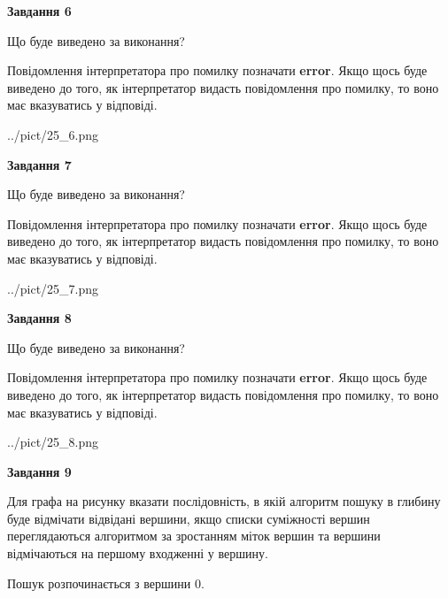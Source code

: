\documentclass[12pt, ukrainian]{article}
\begin{document}
{\begin {large}
{\begin {center}\textbf{Завдання 6}\end {center}}\par
Що буде виведено за виконання?

Повідомлення інтерпретатора про помилку позначати \textbf{error}.
Якщо щось буде виведено до того, як інтерпретатор видасть повідомлення про помилку, 
то воно має вказуватись у відповіді. \par


\begin{center}
	{../pict/25_6.png}
\end{center}
\newpage

{\begin {center}\textbf{Завдання 7}\end {center}}\par
Що буде виведено за виконання?

Повідомлення інтерпретатора про помилку позначати \textbf{error}.
Якщо щось буде виведено до того, як інтерпретатор видасть повідомлення про помилку, 
то воно має вказуватись у відповіді. \par


\begin{center}
	{../pict/25_7.png}
\end{center}
\newpage

{\begin {center}\textbf{Завдання 8}\end {center}}\par
Що буде виведено за виконання?

Повідомлення інтерпретатора про помилку позначати \textbf{error}.
Якщо щось буде виведено до того, як інтерпретатор видасть повідомлення про помилку, 
то воно має вказуватись у відповіді. \par


\begin{center}
	{../pict/25_8.png}
\end{center}
\newpage

{\begin {center}\textbf{Завдання 9}\end {center}}\par
Для графа на рисунку вказати послідовність, в якій алгоритм пошуку в глибину буде відмічати відвідані вершини, якщо списки суміжності вершин переглядаються алгоритмом за зростанням міток вершин та вершини відмічаються на першому вход\-женні у вершину.\par
Пошук розпочинається з вершини 0.\par


\end{large}}
\end{document}
